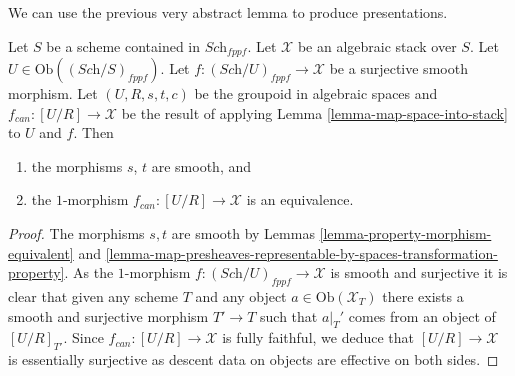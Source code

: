 \noindent
We can use the previous very abstract lemma to produce
presentations.

\begin{lemma}
\label{lemma-space-presentation}
Let $S$ be a scheme contained in $\textit{Sch}_{fppf}$.
Let $\mathcal{X}$ be an algebraic stack over $S$.
Let $U \in \text{Ob}((\textit{Sch}/S)_{fppf})$.
Let $f : (\textit{Sch}/U)_{fppf} \to \mathcal{X}$ be a
surjective smooth morphism.
Let $(U, R, s, t, c)$ be the groupoid in algebraic spaces
and $f_{can} : [U/R] \to \mathcal{X}$ be the result of applying
Lemma \ref{lemma-map-space-into-stack}
to $U$ and $f$. Then
\begin{enumerate}
\item the morphisms $s$, $t$ are smooth, and
\item the $1$-morphism $f_{can} : [U/R] \to \mathcal{X}$
is an equivalence.
\end{enumerate}
\end{lemma}

\begin{proof}
The morphisms $s, t$ are smooth by
Lemmas \ref{lemma-property-morphism-equivalent} and
\ref{lemma-map-presheaves-representable-by-spaces-transformation-property}.
As the $1$-morphism
$f : (\textit{Sch}/U)_{fppf} \to \mathcal{X}$ is smooth and
surjective it is clear that given any scheme $T$ and any object
$a \in \text{Ob}(\mathcal{X}_T)$ there exists a smooth and surjective
morphism $T' \to T$ such that $a|_T'$ comes from an object of
$[U/R]_{T'}$. Since $f_{can} : [U/R] \to \mathcal{X}$
is fully faithful, we deduce that
$[U/R] \to \mathcal{X}$ is essentially surjective as
descent data on objects are effective on both sides.
\end{proof}











